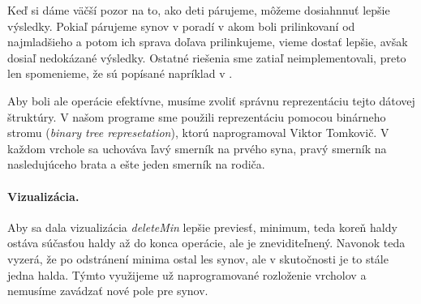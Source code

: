 Keď si dáme väčší pozor na to, ako deti párujeme, môžeme dosiahnnuť lepšie výsledky. Pokiaľ párujeme synov v poradí v akom boli prilinkovaní od najmladšieho a potom ich sprava doľava prilinkujeme, vieme dostať lepšie, avšak dosiaľ nedokázané výsledky.
Ostatné riešenia sme zatiaľ neimplementovali, preto len spomenieme, že sú popísané napríklad v \cite{pairing}.

Aby boli ale operácie efektívne, musíme zvoliť správnu reprezentáciu tejto dátovej štruktúry. V našom programe sme použili 
reprezentáciu pomocou binárneho stromu (\emph{binary tree represetation}), ktorú naprogramoval Viktor Tomkovič. V každom vrchole sa uchováva ľavý smerník na prvého syna, pravý smerník na nasledujúceho brata a ešte jeden smerník na rodiča.

\paragraph{Vizualizácia.}
Aby sa dala vizualizácia \emph{deleteMin} lepšie previesť, minimum, teda koreň haldy ostáva súčasťou haldy až do konca operácie, ale je zneviditeľnený. Navonok teda vyzerá, že po odstránení minima ostal les synov, ale v skutočnosti je to stále jedna halda. Týmto využijeme už naprogramované rozloženie vrcholov a nemusíme zavádzať nové pole pre synov.